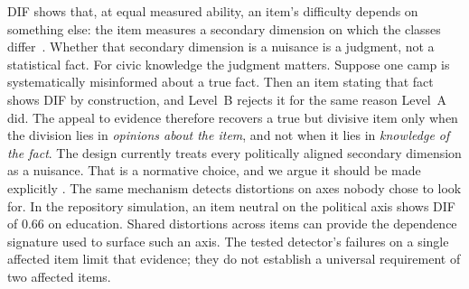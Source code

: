 DIF shows that, at equal measured ability, an item's difficulty depends on something else: the
item measures a secondary dimension on which the classes differ~\cite{shealy1993sibtest}.
Whether that secondary dimension is a nuisance is a judgment, not a statistical fact. For civic
knowledge the judgment matters. Suppose one camp is systematically misinformed about a
true fact. Then an item stating that fact shows DIF by construction, and Level~B rejects it for
the same reason Level~A did. The appeal to evidence therefore recovers a true but divisive item
only when the division lies in \emph{opinions about the item}, and not when it lies in
\emph{knowledge of the fact}. The design currently treats every politically aligned secondary
dimension as a nuisance. That is a normative choice, and we argue it should be made explicitly
\designchoice. The same mechanism detects distortions on axes nobody chose to look for. In the
repository simulation, an item neutral on the political axis shows DIF of $0.66$ on education.
Shared distortions across items can provide the dependence signature used to surface such an
axis. The tested detector's failures on a single affected item limit that evidence; they do not
establish a universal requirement of two affected items.
